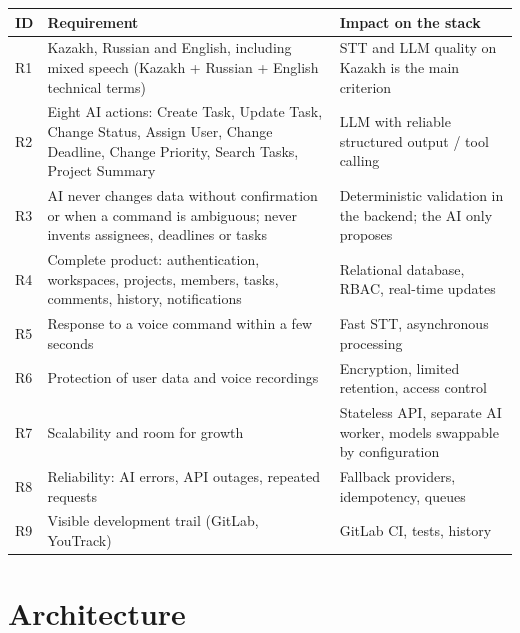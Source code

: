 \documentclass[11pt,a4paper]{article}
\newcommand{\tblstart}{\small\rowcolors{2}{gray!7}{white}}
\begin{document}
{\tblstart
\begin{xltabular}{\textwidth}{P{0.9cm} P{6.4cm} L}
\toprule
\textbf{ID} & \textbf{Requirement} & \textbf{Impact on the stack} \\
\midrule
\endhead
R1 & Kazakh, Russian and English, including mixed speech (Kazakh + Russian + English technical terms) & STT and LLM quality on Kazakh is the main criterion \\
R2 & Eight AI actions: Create Task, Update Task, Change Status, Assign User, Change Deadline, Change Priority, Search Tasks, Project Summary & LLM with reliable structured output / tool calling \\
R3 & AI never changes data without confirmation or when a command is ambiguous; never invents assignees, deadlines or tasks & Deterministic validation in the backend; the AI only proposes \\
R4 & Complete product: authentication, workspaces, projects, members, tasks, comments, history, notifications & Relational database, RBAC, real-time updates \\
R5 & Response to a voice command within a few seconds & Fast STT, asynchronous processing \\
R6 & Protection of user data and voice recordings & Encryption, limited retention, access control \\
R7 & Scalability and room for growth & Stateless API, separate AI worker, models swappable by configuration \\
R8 & Reliability: AI errors, API outages, repeated requests & Fallback providers, idempotency, queues \\
R9 & Visible development trail (GitLab, YouTrack) & GitLab CI, tests, history \\
\bottomrule
\end{xltabular}}

\section{Architecture}
\end{document}
